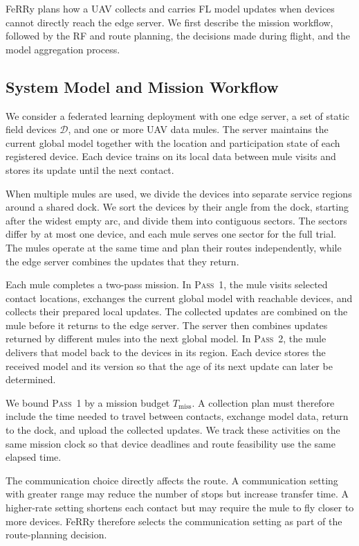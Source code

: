 \documentclass[conference]{IEEEtran}
\begin{document}
FeRRy plans how a UAV collects and carries FL model updates when devices cannot
directly reach the edge server. We first describe the mission workflow, followed
by the RF and route planning, the decisions made during flight, and the model
aggregation process.

\subsection{System Model and Mission Workflow}
\label{sec:system-model}


We consider a federated learning deployment with one edge server, a set of
static field devices $\mathcal{D}$, and one or more UAV data mules. The server
maintains the current global model together with the location and participation
state of each registered device. Each device trains on its local data between
mule visits and stores its update until the next contact.

When multiple mules are used, we divide the devices into separate service
regions around a shared dock. We sort the devices by their angle from the dock,
starting after the widest empty arc, and divide them into contiguous sectors.
The sectors differ by at most one device, and each mule serves one sector for
the full trial. The mules operate at the same time and plan their routes
independently, while the edge server combines the updates that they return.

Each mule completes a two-pass mission. In \textsc{Pass~1}, the mule visits
selected contact locations, exchanges the current global model with reachable
devices, and collects their prepared local updates. The collected updates are
combined on the mule before it returns to the edge server. The server then
combines updates returned by different mules into the next global model. In
\textsc{Pass~2}, the mule delivers that model back to the devices in its region.
Each device stores the received model and its version so that the age of its next
update can later be determined.

We bound \textsc{Pass~1} by a mission budget $T_{\mathrm{miss}}$. A collection
plan must therefore include the time needed to travel between contacts,
exchange model data, return to the dock, and upload the collected updates. We
track these activities on the same mission clock so that device deadlines and
route feasibility use the same elapsed time.

The communication choice directly affects the route. A communication setting
with greater range may reduce the number of stops but increase transfer time.
A higher-rate setting shortens each contact but may require the mule to fly
closer to more devices. FeRRy therefore selects the communication setting as
part of the route-planning decision.
\end{document}
